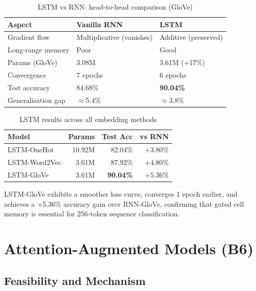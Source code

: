 \documentclass[10pt,a4paper,twocolumn]{article}
\begin{document}
\begin{table}[H]
\centering\small
\caption{LSTM vs RNN: head-to-head comparison (GloVe)}
\begin{tabular}{lll}
\toprule
Aspect & Vanilla RNN & LSTM\\
\midrule
Gradient flow    & Multiplicative (vanishes) & Additive (preserved)\\
Long-range memory& Poor & Good\\
Params (GloVe)   & 3.08M & 3.61M (+17\%)\\
Convergence      & 7 epochs & 6 epochs\\
Test accuracy    & 84.68\% & \textbf{90.04\%}\\
Generalisation gap & $\approx$5.4\% & $\approx$3.8\%\\
\bottomrule
\end{tabular}
\label{tab:lstm_vs_rnn}
\end{table}

\begin{table}[H]
\centering\small
\caption{LSTM results across all embedding methods}
\begin{tabular}{lrrr}
\toprule
Model & Params & Test Acc & vs RNN\\
\midrule
LSTM-OneHot   & 10.92M & 82.04\% & $+3.80\%$\\
LSTM-Word2Vec &  3.61M & 87.92\% & $+4.80\%$\\
LSTM-GloVe    &  3.61M & \textbf{90.04\%} & $+5.36\%$\\
\bottomrule
\end{tabular}
\label{tab:lstm_results}
\end{table}

LSTM-GloVe exhibits a smoother loss curve, converges 1 epoch earlier,
and achieves a +5.36\% accuracy gain over RNN-GloVe, confirming that
gated cell memory is essential for 256-token sequence classification.

\section{Attention-Augmented Models (B6)}

\subsection{Feasibility and Mechanism}
\end{document}
